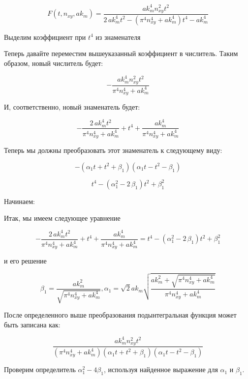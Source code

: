 \documentclass[11pt]{article}
\begin{document}
\[F\left(t, n_{xy}, ak_m\right) = \frac{\mathit{ak}_{m}^{4} n_{\mathit{xy}}^{2} t^{2}}{2 \, \mathit{ak}_{m}^{4} t^{2} - {\left(\pi^{4} n_{\mathit{xy}}^{4} + \mathit{ak}_{m}^{4}\right)} t^{4} - \mathit{ak}_{m}^{4}}\]

    Выделим коэффициент при \(t^4\) из знаменателя

    Теперь давайте переместим вышеуказанный коэффициент в числитель. Таким
образом, новый числитель будет:

    \[-\frac{\mathit{ak}_{m}^{4} n_{\mathit{xy}}^{2} t^{2}}{\pi^{4} n_{\mathit{xy}}^{4} + \mathit{ak}_{m}^{4}}\]

    И, соответственно, новый знаменатель будет:

    \[-\frac{2 \, \mathit{ak}_{m}^{4} t^{2}}{\pi^{4} n_{\mathit{xy}}^{4} + \mathit{ak}_{m}^{4}} + t^{4} + \frac{\mathit{ak}_{m}^{4}}{\pi^{4} n_{\mathit{xy}}^{4} + \mathit{ak}_{m}^{4}}\]

    Теперь мы должны преобразовать этот знаменатель к следующему виду:

    \[-{\left(\alpha_{1} t + t^{2} + \beta_{1}\right)} {\left(\alpha_{1} t - t^{2} - \beta_{1}\right)}\]

\[t^{4} - {\left(\alpha_{1}^{2} - 2 \, \beta_{1}\right)} t^{2} + \beta_{1}^{2}\]

    Начинаем:

    Итак, мы имеем следующее уравнение

\[-\frac{2 \, \mathit{ak}_{m}^{4} t^{2}}{\pi^{4} n_{\mathit{xy}}^{4} + \mathit{ak}_{m}^{4}} + t^{4} + \frac{\mathit{ak}_{m}^{4}}{\pi^{4} n_{\mathit{xy}}^{4} + \mathit{ak}_{m}^{4}} = t^{4} - {\left(\alpha_{1}^{2} - 2 \, \beta_{1}\right)} t^{2} + \beta_{1}^{2}\]

и его решение

\[\beta_{1} = \frac{\mathit{ak}_{m}^{2}}{\sqrt{\pi^{4} n_{\mathit{xy}}^{4} + \mathit{ak}_{m}^{4}}}, \alpha_{1} = \sqrt{2} \mathit{ak}_{m} \sqrt{\frac{\mathit{ak}_{m}^{2} + \sqrt{\pi^{4} n_{\mathit{xy}}^{4} + \mathit{ak}_{m}^{4}}}{\pi^{4} n_{\mathit{xy}}^{4} + \mathit{ak}_{m}^{4}}}\]

    После определенного выше преобразования подынтегральная функция может
быть записана как:

    \[\frac{\mathit{ak}_{m}^{4} n_{\mathit{xy}}^{2} t^{2}}{{\left(\pi^{4} n_{\mathit{xy}}^{4} + \mathit{ak}_{m}^{4}\right)} {\left(\alpha_{1} t + t^{2} + \beta_{1}\right)} {\left(\alpha_{1} t - t^{2} - \beta_{1}\right)}}\]

    Проверим определитель \(\alpha_1^2 - 4\beta_1\), используя найденное
выражение для \(\alpha_1\) и \(\beta_1\).
\end{document}

